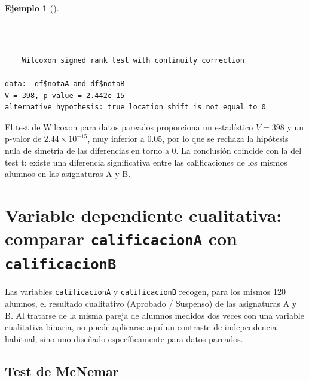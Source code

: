 \documentclass[
  spanish,
  a4paper,
]{scrreport}
\newenvironment{Shaded}{\begin{snugshade}}{\end{snugshade}}
\newcommand{\AttributeTok}[1]{\textcolor[rgb]{0.40,0.45,0.13}{#1}}
\newcommand{\ConstantTok}[1]{\textcolor[rgb]{0.56,0.35,0.01}{#1}}
\newcommand{\FunctionTok}[1]{\textcolor[rgb]{0.28,0.35,0.67}{#1}}
\newcommand{\NormalTok}[1]{\textcolor[rgb]{0.00,0.23,0.31}{#1}}
\newcommand{\SpecialCharTok}[1]{\textcolor[rgb]{0.37,0.37,0.37}{#1}}
\newcommand{\StringTok}[1]{\textcolor[rgb]{0.13,0.47,0.30}{#1}}
\theoremstyle{definition}
\newtheorem{example}{Ejemplo}[chapter]
\theoremstyle{definition}
\theoremstyle{remark}
\begin{document}
\begin{example}[]\protect\hypertarget{exm-dospareadas-wilcoxon-pareado}{}\label{exm-dospareadas-wilcoxon-pareado}

~

\begin{Shaded}
\end{Shaded}

\begin{verbatim}

    Wilcoxon signed rank test with continuity correction

data:  df$notaA and df$notaB
V = 398, p-value = 2.442e-15
alternative hypothesis: true location shift is not equal to 0
\end{verbatim}

El test de Wilcoxon para datos pareados proporciona un estadístico
\(V=398\) y un p-valor de \(2.44\times10^{-15}\), muy inferior a 0.05,
por lo que se rechaza la hipótesis nula de simetría de las diferencias
en torno a 0. La conclusión coincide con la del test t: existe una
diferencia significativa entre las calificaciones de los mismos alumnos
en las asignaturas A y B.

\end{example}

\section{\texorpdfstring{Variable dependiente cualitativa: comparar
\texttt{calificacionA} con
\texttt{calificacionB}}{Variable dependiente cualitativa: comparar calificacionA con calificacionB}}\label{variable-dependiente-cualitativa-comparar-calificaciona-con-calificacionb}

Las variables \texttt{calificacionA} y \texttt{calificacionB} recogen,
para los mismos 120 alumnos, el resultado cualitativo (Aprobado /
Suspenso) de las asignaturas A y B. Al tratarse de la misma pareja de
alumnos medidos dos veces con una variable cualitativa binaria, no puede
aplicarse aquí un contraste de independencia habitual, sino uno diseñado
específicamente para datos pareados.

\subsection{Test de McNemar}\label{test-de-mcnemar}
\end{document}
